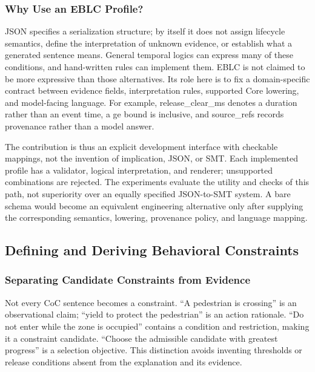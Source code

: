 \documentclass[nolineno]{ieeeaccess}
\begin{document}
\subsubsection{Why Use an EBLC Profile?}

JSON specifies a serialization structure; by itself it does not assign lifecycle semantics, define the interpretation of unknown evidence, or establish what a generated sentence means. General temporal logics can express many of these conditions, and hand-written rules can implement them. EBLC is not claimed to be more expressive than those alternatives. Its role here is to fix a domain-specific contract between evidence fields, interpretation rules, supported Core lowering, and model-facing language. For example, {\ttfamily{}\selectfont\footnotesize release\_\allowbreak clear\_\allowbreak ms} denotes a duration rather than an event time, a {\ttfamily{}\selectfont\footnotesize ge} bound is inclusive, and {\ttfamily{}\selectfont\footnotesize source\_\allowbreak refs} records provenance rather than a model answer.\par

The contribution is thus an explicit development interface with checkable mappings, not the invention of implication, JSON, or SMT. Each implemented profile has a validator, logical interpretation, and renderer; unsupported combinations are rejected. The experiments evaluate the utility and checks of this path, not superiority over an equally specified JSON-to-SMT system. A bare schema would become an equivalent engineering alternative only after supplying the corresponding semantics, lowering, provenance policy, and language mapping.\par

\subsection{Defining and Deriving Behavioral Constraints}

\subsubsection{Separating Candidate Constraints from Evidence}

Not every CoC sentence becomes a constraint. “A pedestrian is crossing” is an observational claim; “yield to protect the pedestrian” is an action rationale. “Do not enter while the zone is occupied” contains a condition and restriction, making it a constraint candidate. “Choose the admissible candidate with greatest progress” is a selection objective. This distinction avoids inventing thresholds or release conditions absent from the explanation and its evidence.\par
\end{document}
